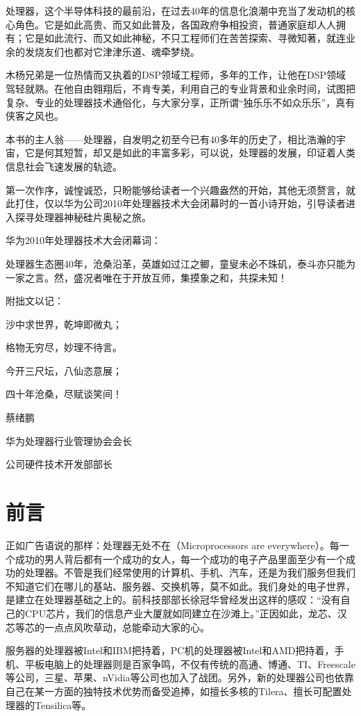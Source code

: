 \documentclass[12pt,UTF8]{ctexbook}
\begin{document}
处理器，这个半导体科技的最前沿，在过去40年的信息化浪潮中充当了发动机的核心角色。它是如此高贵、而又如此普及，各国政府争相投资，普通家庭却人人拥有；它是如此流行、而又如此神秘，不只工程师们在苦苦探索、寻微知著，就连业余的发烧友们也都对它津津乐道、魂牵梦绕。

木杨兄弟是一位热情而又执着的DSP领域工程师，多年的工作，让他在DSP领域驾轻就熟。在他自由翱翔后，不肯专美，利用自己的专业背景和业余时间，试图把复杂、专业的处理器技术通俗化，与大家分享，正所谓“独乐乐不如众乐乐”，真有侠客之风也。

本书的主人翁——处理器，自发明之初至今已有40多年的历史了，相比浩瀚的宇宙，它是何其短暂，却又是如此的丰富多彩，可以说，处理器的发展，印证着人类信息社会飞速发展的轨迹。

第一次作序，诚惶诚恐，只盼能够给读者一个兴趣盎然的开始，其他无须赘言，就此打住，仅以华为公司2010年处理器技术大会闭幕时的一首小诗开始，引导读者进入探寻处理器神秘硅片奥秘之旅。

华为2010年处理器技术大会闭幕词：

处理器生态圈40年，沧桑沿革，英雄如过江之鲫，童叟未必不珠矶，泰斗亦只能为一家之言。然，盛况者唯在于开放互师，集摸象之和，共探未知！

附拙文以记：

沙中求世界，乾坤即微丸；

格物无穷尽，妙理不待言。

今开三尺坛，八仙恣意展；

四十年沧桑，尽赋谈笑间！

蔡绪鹏

华为处理器行业管理协会会长

公司硬件技术开发部部长

\chapter{前言}

正如广告语说的那样：处理器无处不在（Microprocessors are everywhere）。每一个成功的男人背后都有一个成功的女人，每一个成功的电子产品里面至少有一个成功的处理器。不管是我们经常使用的计算机、手机、汽车，还是为我们服务但我们不知道它们在哪儿的基站、服务器、交换机等，莫不如此。我们身处的电子世界，是建立在处理器基础之上的。前科技部部长徐冠华曾经发出这样的感叹：“没有自己的CPU芯片，我们的信息产业大厦就如同建立在沙滩上。”正因如此，龙芯、汉芯等芯的一点点风吹草动，总能牵动大家的心。

服务器的处理器被Intel和IBM把持着，PC机的处理器被Intel和AMD把持着，手机、平板电脑上的处理器则是百家争鸣，不仅有传统的高通、博通、TI、Freescale等公司，三星、苹果、nVidia等公司也加入了战团。另外，新的处理器公司也依靠自己在某一方面的独特技术优势而备受追捧，如擅长多核的Tilera、擅长可配置处理器的Tensilica等。
\end{document}
